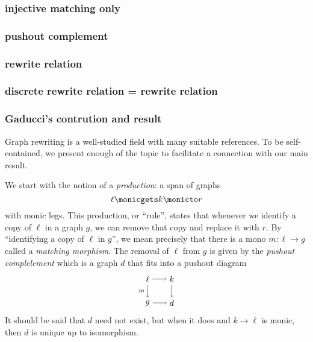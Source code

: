 \documentclass{amsart}
\newcommand{\from}{\colon}
\theoremstyle{remark}
\theoremstyle{definition}
\begin{document}
\subsubsection{injective matching only}
\label{sec-3-2-3}
\subsubsection{pushout complement}
\label{sec-3-2-4}
\subsubsection{rewrite relation}
\label{sec-3-2-5}
\subsubsection{discrete rewrite relation = rewrite relation}
\label{sec-3-2-6}
\subsubsection{Gaducci's contrution and result}
\label{sec-3-2-7}

Graph rewriting is a well-studied field with many suitable references.
%
%
To be self-contained, we present enough of the topic to facilitate a
connection with our main result.  

We start with the notion of a \emph{production}: a
span of graphs
%
\[
  \ell \monicgets k \monicto r
\]
%
with monic legs. This production, or ``rule'', states that whenever
we identify a copy of $ \ell $ in a graph $ g $, we can remove
that copy and replace it with $ r $.  By ``identifying a copy of $
\ell $ in $ g $'', we mean precisely that there is a mono $ m \from
\ell \to g $ called a \emph{matching morphism}.  The removal of $ \ell
$ from $ g $ is given by the \emph{pushout complelement} which is a
graph $ d $ that fits into a pushout diagram
%
\[
  \begin{tikzpicture}
    \node (1) at (0,1) {$ \ell $};
    \node (2) at (1,1) {$ k $};
    \node (3) at (0,0) {$ g $};
    \node (4) at (1,0) {$ d $};
    \draw [->] (1) to node [] {\scriptsize{$  $}} (2);
    \draw [->] (1) to node [left] {\scriptsize{$ m $}} (3);
    \draw [->] (3) to node [] {\scriptsize{$  $}} (4);
    \draw [->] (2) to node [] {\scriptsize{$  $}} (4);
  \end{tikzpicture}
\]
% 
It should be said that $ d $ need not exist, but when it does and
$ k \to \ell $ is monic, then $ d $ is unique up to isomorphism.
\end{document}
